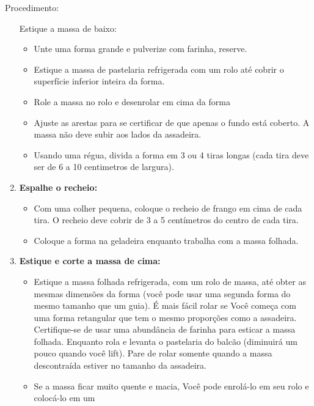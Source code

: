 \documentclass [11pt, letterpaper] {article}
\begin{document}
\begin {description}
\item[Procedimento:]\ \\
\begin{enumerate}
\item [Estique a massa de baixo:] \ \\
        \begin{itemize}
        \item Unte uma forma grande e pulverize com farinha, reserve.
        \item Estique a massa de pastelaria refrigerada com um rolo até cobrir o
        superfície inferior inteira da forma.
        \item Role a massa no rolo e desenrolar em cima da forma
        \item Ajuste as arestas para se certificar de que apenas o fundo está coberto. A massa n\~ao deve subir aos lados da assadeira.
        \item Usando uma régua, divida a forma em 3
        ou 4 tiras longas (cada tira deve ser de 6 a 10 centimetros de largura).
        \end{itemize}
\item{\bf Espalhe o recheio:}    
       \begin{itemize}    
        \item Com uma colher pequena, coloque o recheio de frango em cima de cada tira. O recheio deve cobrir de 3 a 5 cent\'imetros do centro  de cada tira.
        \item Coloque a forma na geladeira enquanto trabalha
        com a massa folhada.
        \end{itemize}
\item{\bf Estique e corte a massa de cima:}    
       \begin{itemize}
        \item Estique a massa folhada refrigerada, com um rolo de massa, at\'e obter as mesmas
        dimens\~oes da forma (você pode usar uma segunda
        forma do mesmo tamanho que um guia). É mais fácil rolar se
        Você começa com uma forma retangular que tem o mesmo
        proporções como a assadeira. Certifique-se de usar uma abundância de
        farinha para esticar a massa folhada. Enquanto rola e levanta o
        pastelaria do balc\~ao (diminuirá um pouco quando você
        lift). Pare de rolar somente quando a massa descontraída estiver no tamanho
        da assadeira. 
        \item Se a massa ficar muito quente e macia,
        Você pode enrolá-lo em seu rolo e colocá-lo em um

\end{itemize}
\end{enumerate}
\end{description}
\end{document}
